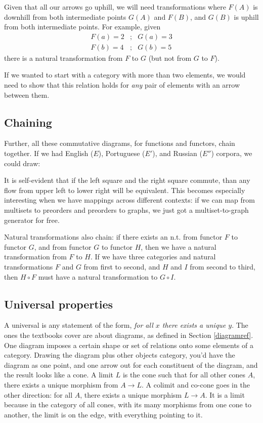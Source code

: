 \documentclass[11pt]{article}
\begin{document}
Given that all our arrows go uphill, we will need transformations where $F(A)$ is downhill
from both intermediate points $G(A)$ and $F(B)$, and $G(B)$ is uphill from both
intermediate points. For example, given
\begin{eqnarray*}
    F(a) = 2 &;& G(a) = 3\\
    F(b) = 4 &;& G(b) = 5
\end{eqnarray*} 
there is a natural transformation from $F$ to $G$ (but not from $G$ to $F$).

If we wanted to start with a category with more than two elements, we would need to show
that this relation holds for {\em any} pair of elements with an arrow between them.

\subsection{Chaining}
Further, all these commutative diagrams, for functions and functors, chain together. If
we had English ($E$), Portuguese ($E'$), and Russian  ($E''$) corpora, we could draw:


It is self-evident that if the left square and the right square commute, than any flow
from upper left to lower right will be equivalent. This becomes especially interesting
when we have mappings across different contexts: if we can map from multisets to preorders
and preorders to graphs, we just got a multiset-to-graph generator for free.

Natural transformations also chain: if there exists an n.t. from functor $F$ to functor
$G$, and from functor $G$ to functor $H$, then we have a natural transformation from $F$
to $H$. If we have three categories and natural transformations $F$ and $G$ from first to
second, and $H$ and $I$ from second to third, then $H\circ F$ must have a natural
transformation to $G\circ I$.

\subsection{Universal properties}\label{universalsec}
A universal is any statement of the form, {\em for all $x$ there exists a unique $y$}.
The ones the textbooks cover are about diagrams, as defined in Section \ref{diagramref}.
One diagram imposes a certain shape or set of relations onto some elements of a category.
Drawing the diagram plus other objects category, you'd have the diagram as one point, and
one arrow out for each constituent of the diagram, and the result looks like a cone.
A limit $L$ is the cone such that for all other cones $A$, there exists a unique
morphism from $A\to L$. A colimit and co-cone goes in the other direction: for all $A$,
there exists a unique morphism $L\to A$. It is a limit because in the category of all
cones, with its many morphisms from one cone to another, the limit is on the edge,
with everything pointing to it.
\end{document}
